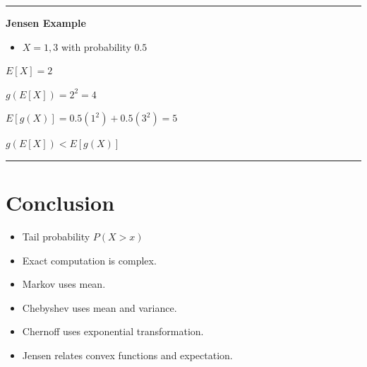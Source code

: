 \documentclass[12pt]{article}
\begin{document}
\vspace{1em}
\hrule
\vspace{1em}

\textbf{Jensen Example}

\begin{itemize}
    \item $X = 1, 3$ with probability $0.5$
\end{itemize}

\begin{center}
    $E[X] = 2$
\end{center}

\begin{center}
    $g(E[X]) = 2^2 = 4$
\end{center}

\begin{center}
    $E[g(X)] = 0.5(1^2) + 0.5(3^2) = 5$
\end{center}

\begin{center}
    $g(E[X]) < E[g(X)]$
\end{center}
\noindent\rule{\textwidth}{0.4pt}
\section*{Conclusion}

\begin{itemize}

    \item Tail probability $P(X > x)$
    \item Exact computation is complex.
    \item Markov uses mean.
    \item Chebyshev uses mean and variance.
        \item Chernoff uses exponential transformation.
        \item Jensen relates convex functions and expectation.

\end{itemize}
\end{document}
